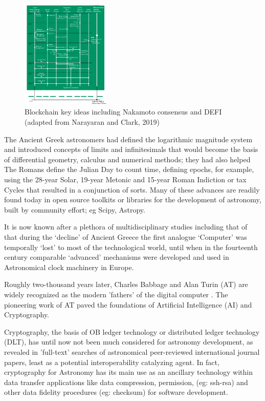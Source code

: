 \documentclass[final,5p,times,twocolumn,authoryear]{elsarticle}
\begin{document}
 \begin{figure}
    \centering
    \includegraphics[width=0.38\textwidth]{narayanan3.png}
    \vspace*{-0.3cm}
    \caption{Blockchain key ideas including Nakamoto consensus and DEFI (adapted from Narayaran and Clark, 2019)}
    \label{fig:narayanan}
\end{figure}
 
 The Ancient Greek astronomers had defined the logarithmic magnitude system and introduced concepts of limits and infinitesimals that would become the basis of differential geometry, calculus and numerical methods; they had also helped The Romans define the Julian Day to count time, defining epochs, for example, using the 28-year Solar, 19-year Metonic and 15-year Roman Indiction or tax Cycles that resulted in a conjunction of sorts. Many of these advances are readily found today in open source toolkits or libraries for the development of astronomy, built by community effort; eg Scipy, Astropy. 
 
 It is now known after a plethora of multidisciplinary studies including that of \cite{Freeth2021} that during the `decline' of Ancient Greece the first analogue `Computer' was temporally `lost' to most of the technological world, until when in the fourteenth century comparable `advanced' mechanisms were developed and used in Astronomical clock machinery in Europe. 
 
 Roughly two-thousand years later, Charles Babbage and Alan Turin (AT) are widely recognized as the modern 'fathers' of the digital computer \citep{swa2017}. The pioneering work of AT paved the foundations of Artificial Intelligence (AI) and Cryptography. 
 
Cryptography, the basis of OB ledger technology or distributed ledger technology (DLT), has until now not been much considered for astronomy development, as revealed in 'full-text' searches of astronomical peer-reviewed international journal papers, least as a potential interoperability catalyzing agent. In fact, cryptography for Astronomy has its main use as an ancillary technology within data transfer applications like data compression, permission, (eg: ssh-rsa) and other data fidelity procedures (eg: checksum) for software development.
\end{document}
